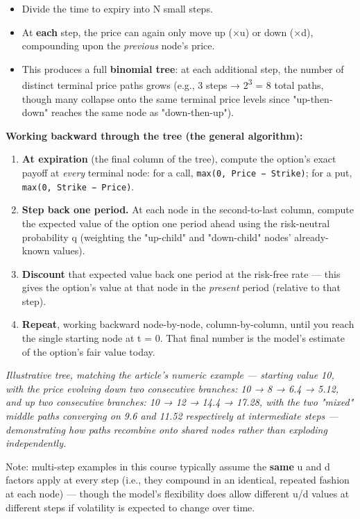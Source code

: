 \documentclass[12pt,openany]{book}
\theoremstyle{definition}
\theoremstyle{remark}
\begin{document}
\begin{itemize}
\item Divide the time to expiry into N small steps.
\item At \textbf{each} step, the price can again only move up (×u) or down (×d), compounding upon the \emph{previous} node's price.
\item This produces a full \textbf{binomial tree}: at each additional step, the number of distinct terminal price paths grows (e.g., 3 steps → 2\textsuperscript{3} = 8 total paths, though many collapse onto the same terminal price levels since "up-then-down" reaches the same node as "down-then-up").
\end{itemize}
\textbf{Working backward through the tree (the general algorithm):}
\begin{enumerate}
\item \textbf{At expiration} (the final column of the tree), compute the option's exact payoff at \emph{every} terminal node: for a call, \texttt{max(0, Price − Strike)}; for a put, \texttt{max(0, Strike − Price)}.
\item \textbf{Step back one period.} At each node in the second-to-last column, compute the expected value of the option one period ahead using the risk-neutral probability q (weighting the "up-child" and "down-child" nodes' already-known values).
\item \textbf{Discount} that expected value back one period at the risk-free rate — this gives the option's value at that node in the \emph{present} period (relative to that step).
\item \textbf{Repeat}, working backward node-by-node, column-by-column, until you reach the single starting node at t = 0. That final number is the model's estimate of the option's fair value today.
\end{enumerate}
\emph{Illustrative tree, matching the article's numeric example — starting value 10, with the price evolving down two consecutive branches: 10 → 8 → 6.4 → 5.12, and up two consecutive branches: 10 → 12 → 14.4 → 17.28, with the two "mixed" middle paths converging on 9.6 and 11.52 respectively at intermediate steps — demonstrating how paths recombine onto shared nodes rather than exploding independently.}

Note: multi-step examples in this course typically assume the \textbf{same} u and d factors apply at every step (i.e., they compound in an identical, repeated fashion at each node) — though the model's flexibility does allow different u/d values at different steps if volatility is expected to change over time.
\end{document}
